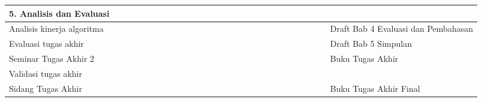 \begin{landscape}
\begin{table}
\begin{tabularx}{\linewidth}{X *{26}{>{\centering\arraybackslash}m{12pt}}X}
            \multicolumn{28}{l}{5. Analisis dan Evaluasi}                                                                                     \\ \midrule
            Analisis kinerja algoritma                      &   &  &   &  &   &  &  &   &   &   &   &   &  &  &
            \cellcolor[HTML]{333333}                        &
            \cellcolor[HTML]{333333}                        &
            \cellcolor[HTML]{333333}                        &   &  &   &  &   &  &  &   &   &
            Draft Bab 4 Evaluasi dan Pembahasan                                                                                               \\ \cmidrule{1-1} \cmidrule{28-28}
            Evaluasi tugas akhir                            &   &  &   &  &   &  &  &   &   &   &   &   &  &  &   &
            \cellcolor[HTML]{333333}                        &
            \cellcolor[HTML]{333333}                        &   &  &   &  &   &  &  &   &   &
            Draft Bab 5 Simpulan                                                                                                              \\ \cmidrule{1-1} \cmidrule{28-28}
            Seminar Tugas Akhir 2                           &   &  &   &  &   &  &  &   &   &   &   &   &  &  &   &   &   &
            \cellcolor[HTML]{333333}                        &   &  &   &  &   &  &  &   &
            Buku Tugas Akhir                                                                                                                  \\ \cmidrule{1-1} \cmidrule{28-28}
            Validasi tugas akhir                            &   &  &   &  &   &  &  &   &   &   &   &   &  &  &   &   &   &   &
            \cellcolor[HTML]{333333}                        &
            \cellcolor[HTML]{333333}                        &
            \cellcolor[HTML]{333333}                        &
            \cellcolor[HTML]{333333}                        &   &  &   &  &                                                                   \\ \cmidrule{1-1}
            Sidang Tugas Akhir                              &   &  &   &  &   &  &  &   &   &   &   &   &  &  &   &   &   &   &   &  &   &  &
            \cellcolor[HTML]{333333}                        &
            \cellcolor[HTML]{333333}                        &   &  &
            \multirow{-2}{*}{Buku Tugas Akhir Final}                                                                                          \\ \bottomrule
        \end{tabularx}
    \end{table}

\end{landscape}
\clearpage%
\restoregeometry